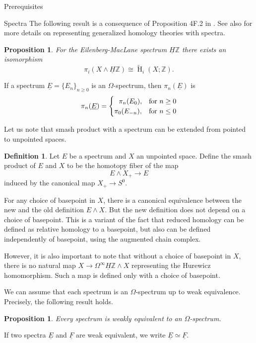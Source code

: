 \documentclass[12pt]{amsart}
\newcommand{\Z}{{\mathbb Z}}
\newcommand{\Ho}{\operatorname{H}}
\newcommand{\HZ}{\underline{H}\Z}
\theoremstyle{plain}
\newtheorem{prop}[thm]{Proposition}
\theoremstyle{definition}
\newtheorem{defin}[thm]{Definition}
\theoremstyle{remark}
\begin{document}
\begin{section}{Prerequisites}
\begin{subsection}{Spectra}
The following result is a consequence of Proposition 4F.2 in \cite{Hatcher}. See also \cite{Wh:GeneralizedHomology} for more details on representing generalized homology theories with spectra.
\begin{prop}
For the Eilenberg-MacLane spectrum $\underline{H} \Z$ there exists an isomorphism $$\pi_i(X \wedge \underline{H} \Z) \cong \widetilde{\Ho}_i(X;\Z).$$
\end{prop}
If a spectrum $\underline{E}=\{E_n\}_{n \geq 0}$ is an $\Omega$-spectrum, then $\pi_n(\underline{E})$ is
 \begin{equation*}
    \pi_n(\underline{E})=
    \begin{cases}
     \hspace{0.23cm} \pi_n(E_0), & \text{for}\ n \geq 0 \\
      \pi_0(E_{-n}), & \text{for} \ n \leq 0
    \end{cases}
  \end{equation*}
  
Let us note that smash product with a spectrum can be extended from pointed to unpointed spaces.
\begin{defin}
Let $E$ be a spectrum and $X$ an unpointed space. Define the smash product of $E$ and $X$ to be the homotopy fiber of the map
$$E\wedge X_+ \to E$$
induced by the canonical map $X_+\to S^0$.
\end{defin}
For any choice of basepoint in $X$, there is a canonical equivalence between the new and the old definition $E\wedge X$. But the new definition does not depend on a choice of basepoint. This is a variant of the fact that reduced homology can be defined as relative homology to a basepoint, but also can be defined independently of basepoint, using the augmented chain complex.

However, it is also important to note that without a choice of basepoint in $X$, there is no natural map $X\to \Omega^\infty\HZ\wedge X$ representing the Hurewicz homomorphism. Such a map is defined only with a choice of basepoint.
  

We can assume that each spectrum is an $\Omega$-spectrum up to weak equivalence. Precisely, the following result holds.
\begin{prop}\label{P:equivalentOmega}
Every spectrum is weakly equivalent to an $\Omega$-spectrum.
\end{prop}
If two spectra $\underline{E}$ and $\underline{F}$ are weak equivalent, we write $\underline{E} \simeq \underline{F}$.


\end{subsection}
\end{section}
\end{document}
